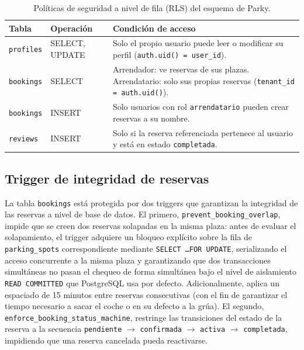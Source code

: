 \begin{table}[htbp]
  \centering
  \caption{Políticas de seguridad a nivel de fila (RLS) del esquema de Parky.}
  \label{tab:rls-policies}
  \begin{tabularx}{\textwidth}{llX}
    \toprule
    \textbf{Tabla}    & \textbf{Operación} & \textbf{Condición de acceso}                                                                                       \\
    \midrule
    \rowcolor{gray!5}
    \texttt{profiles} & SELECT, UPDATE     & Solo el propio usuario puede leer o modificar su perfil (\texttt{auth.uid() = user\_id}).                          \\
    \texttt{bookings} & SELECT             & Arrendador: ve reservas de sus plazas. Arrendatario: solo sus propias reservas (\texttt{tenant\_id = auth.uid()}). \\
    \rowcolor{gray!5}
    \texttt{bookings} & INSERT             & Solo usuarios con rol \texttt{arrendatario} pueden crear reservas a su nombre.                                     \\
    \texttt{reviews}  & INSERT             & Solo si la reserva referenciada pertenece al usuario y está en estado \texttt{completada}.                         \\
    \bottomrule
  \end{tabularx}
\end{table}

\subsection{Trigger de integridad de reservas}
\label{subsec:triggers}

La tabla \texttt{bookings} está protegida por dos triggers que garantizan la integridad de las reservas a nivel de base de datos. El primero, \texttt{prevent\_booking\_overlap}, impide que se creen dos reservas solapadas en la misma plaza: antes de evaluar el solapamiento, el trigger adquiere un bloqueo explícito sobre la fila de \texttt{parking\_spots} correspondiente mediante \texttt{SELECT \ldots FOR UPDATE}, serializando el acceso concurrente a la misma plaza y garantizando que dos transacciones simultáneas no pasan el chequeo de forma simultánea bajo el nivel de aislamiento \texttt{READ COMMITTED} que PostgreSQL usa por defecto. Adicionalmente, aplica un espaciado de 15 minutos entre reservas consecutivas (con el fin de garantizar el tiempo necesario a sacar el coche o en su defecto a la grúa). El segundo, \texttt{enforce\_booking\_status\_machine}, restringe las transiciones del estado de la reserva a la secuencia \texttt{pendiente} $\to$ \texttt{confirmada} $\to$ \texttt{activa} $\to$ \texttt{completada}, impidiendo que una reserva cancelada pueda reactivarse.


